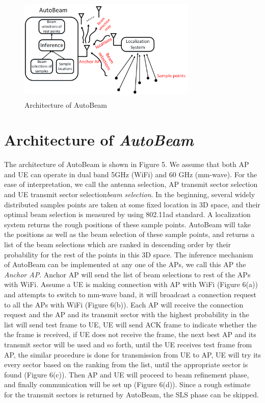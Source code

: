 \documentclass[conference]{IEEEtran}
\begin{document}
\begin{figure}[t!]
	\centerline{\includegraphics[width=8.5cm,height=5cm]{architecture}}
	\caption[U-example]{Architecture of AutoBeam}
\end{figure}
\section{Architecture of \emph{AutoBeam}}
The architecture of AutoBeam is shown in Figure 5. We assume that both AP and UE can operate in dual band 5GHz (WiFi) and 60 GHz (mm-wave). For the ease of interpretation, we call the antenna selection, AP transmit sector selection and UE transmit sector selection\emph{beam selection}. In the beginning, several widely distributed samples points are taken at some fixed location in 3D space, and their optimal beam selection is measured by using 802.11ad standard. A localization system returns the rough positions of these sample points. %
AutoBeam will take the positions as well as the beam selection of these sample points, and returns a list of the beam selections which are ranked in descending order by their probability for the rest of the points in this 3D space. %
The inference mechanism of AutoBeam can be implemented at any one of the APs, we call this AP the \emph{Anchor AP}. Anchor AP will send the list of beam selections to rest of the APs with WiFi. Assume a UE is making connection with AP with WiFi (Figure 6(a)) and attempts to switch to mm-wave band, it will broadcast a connection request to all the APs with WiFi (Figure 6(b)). Each AP will receive the connection request and the AP and its transmit sector with the highest probability in the list will send test frame to UE, UE will send ACK frame to indicate whether the the frame is received, if UE does not receive the frame, the next best AP and its transmit sector will be used and so forth, until the UE receives test frame from AP, the similar procedure is done for transmission from UE to AP, UE will try its every sector based on the ranking from the list, until the appropriate sector is found (Figure 6(c)). Then AP and UE will proceed to beam refinement phase, and finally communication will be set up (Figure 6(d)). Since a rough estimate for the transmit sectors is returned by AutoBeam, the SLS phase can be skipped.   
\end{document}
